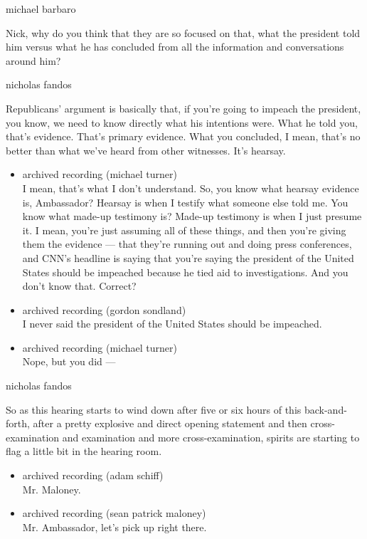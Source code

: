 michael barbaro

Nick, why do you think that they are so focused on that, what the
president told him versus what he has concluded from all the information
and conversations around him?

nicholas fandos

Republicans' argument is basically that, if you're going to impeach the
president, you know, we need to know directly what his intentions were.
What he told you, that's evidence. That's primary evidence. What you
concluded, I mean, that's no better than what we've heard from other
witnesses. It's hearsay.

\begin{itemize}
\item
  archived recording (michael turner)\\
  I mean, that's what I don't understand. So, you know what hearsay
  evidence is, Ambassador? Hearsay is when I testify what someone else
  told me. You know what made-up testimony is? Made-up testimony is when
  I just presume it. I mean, you're just assuming all of these things,
  and then you're giving them the evidence --- that they're running out
  and doing press conferences, and CNN's headline is saying that you're
  saying the president of the United States should be impeached because
  he tied aid to investigations. And you don't know that. Correct?
\item
  archived recording (gordon sondland)\\
  I never said the president of the United States should be impeached.
\item
  archived recording (michael turner)\\
  Nope, but you did ---
\end{itemize}

nicholas fandos

So as this hearing starts to wind down after five or six hours of this
back-and-forth, after a pretty explosive and direct opening statement
and then cross-examination and examination and more cross-examination,
spirits are starting to flag a little bit in the hearing room.

\begin{itemize}
\item
  archived recording (adam schiff)\\
  Mr. Maloney.
\item
  archived recording (sean patrick maloney)\\
  Mr. Ambassador, let's pick up right there.
\end{itemize}

